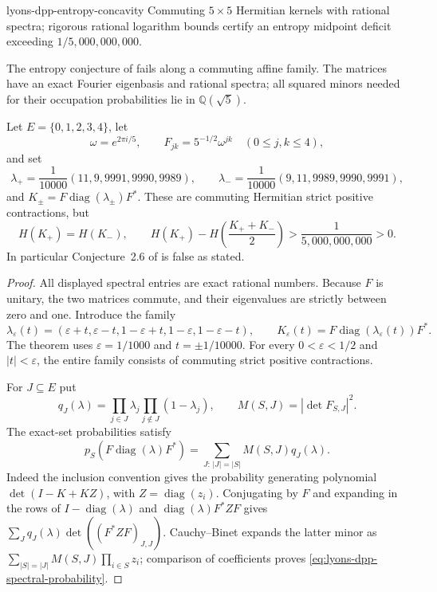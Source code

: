 \begin{cxcertificate}{lyons-dpp-entropy-concavity}
Commuting $5\times5$ Hermitian kernels with rational spectra; rigorous rational logarithm bounds certify an entropy midpoint deficit exceeding $1/5{,}000{,}000{,}000$.
\end{cxcertificate}

\begin{cxrefutation}
The entropy conjecture of \cite{Lyons2014DPP} fails along a commuting affine
family. The matrices have an exact Fourier eigenbasis and rational spectra;
all squared minors needed for their occupation probabilities lie in
$\mathbb Q(\sqrt5)$.

\begin{theorem}\label{thm:lyons-dpp-entropy-concavity}
Let $E=\{0,1,2,3,4\}$, let
\[
 \omega=e^{2\pi i/5},\qquad F_{jk}=5^{-1/2}\omega^{jk}
 \quad(0\le j,k\le4),
\]
and set
\[
 \lambda_+=\frac1{10000}(11,9,9991,9990,9989),\qquad
 \lambda_-=\frac1{10000}(9,11,9989,9990,9991),
\]
and $K_\pm=F\operatorname{diag}(\lambda_\pm)F^*$. These are commuting Hermitian strict positive contractions, but
\[
 H(K_+)=H(K_-),\qquad
 H(K_+)-H\left(\frac{K_++K_-}{2}\right)
 >\frac1{5{,}000{,}000{,}000}>0.
\]
In particular Conjecture~2.6 of \cite{Lyons2014DPP} is false as stated.
\end{theorem}
\begin{proof}
All displayed spectral entries are exact rational numbers. Because $F$ is
unitary, the two matrices commute, and their eigenvalues are strictly between
zero and one. Introduce the family
\[
 \lambda_\varepsilon(t)=
 (\varepsilon+t,\varepsilon-t,1-\varepsilon+t,
  1-\varepsilon,1-\varepsilon-t),\qquad
 K_\varepsilon(t)=F\operatorname{diag}(\lambda_\varepsilon(t))F^*.
\]
The theorem uses $\varepsilon=1/1000$ and $t=\pm1/10000$.
For every $0<\varepsilon<1/2$ and $|t|<\varepsilon$, the entire family
consists of commuting strict positive contractions.

For $J\subseteq E$ put
\[
 q_J(\lambda)=\prod_{j\in J}\lambda_j\prod_{j\notin J}(1-\lambda_j),
 \qquad M(S,J)=|\det F_{S,J}|^2.
\]
The exact-set probabilities satisfy
\begin{equation}\label{eq:lyons-dpp-spectral-probability}
 p_S(F\operatorname{diag}(\lambda)F^*)
 =\sum_{J:\,|J|=|S|}M(S,J)q_J(\lambda).
\end{equation}
Indeed the inclusion convention gives the probability generating polynomial
$\det(I-K+KZ)$, with $Z=\operatorname{diag}(z_i)$. Conjugating by $F$ and
expanding in the rows of $I-\operatorname{diag}(\lambda)$ and
$\operatorname{diag}(\lambda)F^*ZF$ gives
$\sum_Jq_J(\lambda)\det((F^*ZF)_{J,J})$. Cauchy--Binet expands the latter
minor as $\sum_{|S|=|J|}M(S,J)\prod_{i\in S}z_i$; comparison of coefficients
proves \eqref{eq:lyons-dpp-spectral-probability}.


\end{proof}
\end{cxrefutation}
